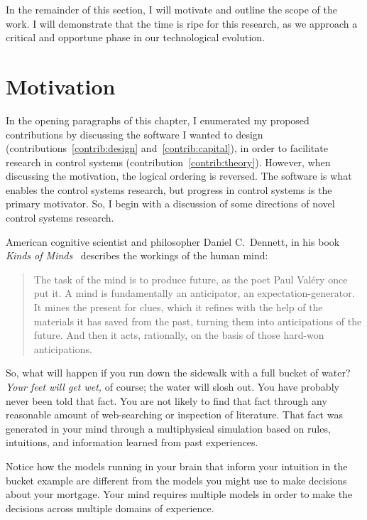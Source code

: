 In the remainder of this section, I will motivate and outline the scope of the
work. I will demonstrate that the time is ripe for this research, as we approach
a critical and opportune phase in our technological evolution.



\section{Motivation}%
\label{sec:motivation}


In the opening paragraphs of this chapter, I enumerated my proposed
contributions by discussing the software I wanted to design
(contributions~\ref{contrib:design} and~\ref{contrib:capital}), in order to
facilitate research in control systems (contribution~\ref{contrib:theory}).
However, when discussing the motivation, the logical ordering is reversed. The
software is what enables the control systems research, but progress in control
systems is the primary motivator. So, I begin with a discussion of some
directions of novel control systems research.

American cognitive scientist and philosopher Daniel C.\ Dennett, in his book
\emph{Kinds of Minds}~\cite{Dennett1997} describes the workings of the human
mind:
%
\begin{quote} The task of the mind is to produce future, as the poet Paul Valéry
once put it. A mind is fundamentally an anticipator, an expectation-generator.
It mines the present for clues, which it refines with the help of the materials
it has saved from the past, turning them into anticipations of the future. And
then it acts, rationally, on the basis of those hard-won anticipations.
\end{quote}

So, what will happen if you run down the sidewalk with a full bucket of water?
\emph{Your feet will get wet,} of course; the water will slosh out. You have probably never been told that fact. You are not
likely to find that fact through any reasonable amount of web-searching or
inspection of literature. That fact was generated in your mind through a
multiphysical simulation based on rules, intuitions, and information learned
from past experiences.

Notice how the models running in your brain that inform your intuition in the
bucket example are different from the models you might use to make decisions
about your mortgage. Your mind requires multiple models in order to make the
decisions across multiple domains of experience.

